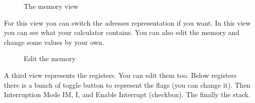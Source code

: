 \documentclass[10pt]{report}
\begin{document}
\begin{figure}[H]
\centering
{}
\caption{The memory view}
\end{figure}
For this view you can switch the adresses representation if you want.\newline
In this view you can see what your calculator contains.\newline
You can also edit the memory and change some values by your own.\newline
\begin{figure}[H]
\centering
{}
\caption{Edit the memory}
\end{figure}
A third view represents the registers.\newline
You can edit them too.\newline
Below registers there is a bunch of toggle button to represent the flags (you can change it).\newline
Then Interruption Mode IM, I, and Enable Interrupt (checkbox).\newline
The finally the stack.\newline
\end{document}
